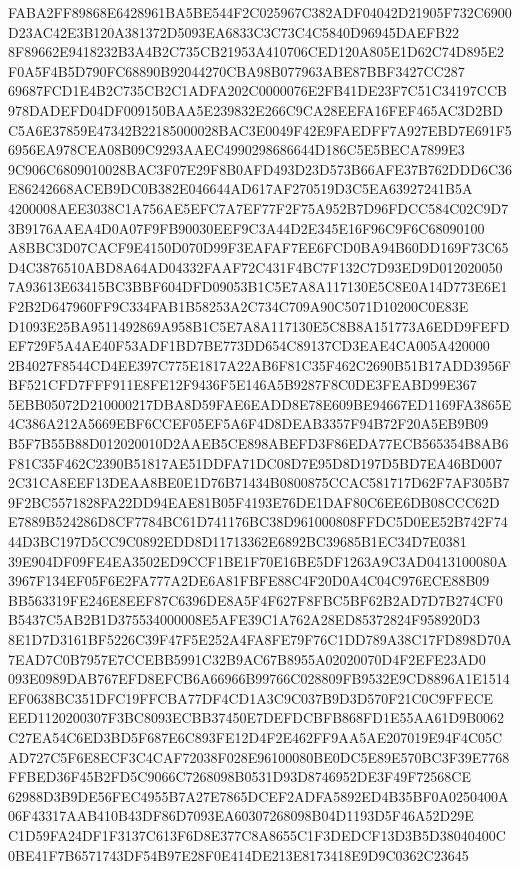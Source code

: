 \documentclass[UTF8,fontset=fandol,zihao=-4,a4paper]{ctexart}
\begin{document}
{{FABA2FF89868E6428961BA5BE544F2C025967C382ADF04042D21905F732C6900D23AC42E3B120A381372D5093EA6833C3C73C4C5840D96945DAEFB22
8F89662E9418232B3A4B2C735CB21953A410706CED120A805E1D62C74D895E2F0A5F4B5D790FC68890B92044270CBA98B077963ABE87BBF3427CC287
69687FCD1E4B2C735CB2C1ADFA202C0000076E2FB41DE23F7C51C34197CCB978DADEFD04DF009150BAA5E239832E266C9CA28EEFA16FEF465AC3D2BD
C5A6E37859E47342B22185000028BAC3E0049F42E9FAEDFF7A927EBD7E691F56956EA978CEA08B09C9293AAEC4990298686644D186C5E5BECA7899E3
9C906C6809010028BAC3F07E29F8B0AFD493D23D573B66AFE37B762DDD6C36E86242668ACEB9DC0B382E046644AD617AF270519D3C5EA63927241B5A
4200008AEE3038C1A756AE5EFC7A7EF77F2F75A952B7D96FDCC584C02C9D73B9176AAEA4D0A07F9FB90030EEF9C3A44D2E345E16F96C9F6C68090100
A8BBC3D07CACF9E4150D070D99F3EAFAF7EE6FCD0BA94B60DD169F73C65D4C3876510ABD8A64AD04332FAAF72C431F4BC7F132C7D93ED9D012020050
7A93613E63415BC3BBF604DFD09053B1C5E7A8A117130E5C8E0A14D773E6E1F2B2D647960FF9C334FAB1B58253A2C734C709A90C5071D10200C0E83E
D1093E25BA9511492869A958B1C5E7A8A117130E5C8B8A151773A6EDD9FEFDEF729F5A4AE40F53ADF1BD7BE773DD654C89137CD3EAE4CA005A420000
2B4027F8544CD4EE397C775E1817A22AB6F81C35F462C2690B51B17ADD3956FBF521CFD7FFF911E8FE12F9436F5E146A5B9287F8C0DE3FEABD99E367
5EBB05072D210000217DBA8D59FAE6EADD8E78E609BE94667ED1169FA3865E4C386A212A5669EBF6CCEF05EF5A6F4D8DEAB3357F94B72F20A5EB9B09
B5F7B55B88D012020010D2AAEB5CE898ABEFD3F86EDA77ECB565354B8AB6F81C35F462C2390B51817AE51DDFA71DC08D7E95D8D197D5BD7EA46BD007
2C31CA8EEF13DEAA8BE0E1D76B71434B0800875CCAC581717D62F7AF305B79F2BC5571828FA22DD94EAE81B05F4193E76DE1DAF80C6EE6DB08CCC62D
E7889B524286D8CF7784BC61D741176BC38D961000808FFDC5D0EE52B742F7444D3BC197D5CC9C0892EDD8D11713362E6892BC39685B1EC34D7E0381
39E904DF09FE4EA3502ED9CCF1BE1F70E16BE5DF1263A9C3AD0413100080A3967F134EF05F6E2FA777A2DE6A81FBFE88C4F20D0A4C04C976ECE88B09
BB563319FE246E8EEF87C6396DE8A5F4F627F8FBC5BF62B2AD7D7B274CF0B5437C5AB2B1D375534000008E5AFE39C1A762A28ED85372824F958920D3
8E1D7D3161BF5226C39F47F5E252A4FA8FE79F76C1DD789A38C17FD898D70A7EAD7C0B7957E7CCEBB5991C32B9AC67B8955A02020070D4F2EFE23AD0
093E0989DAB767EFD8EFCB6A66966B99766C028809FB9532E9CD8896A1E1514EF0638BC351DFC19FFCBA77DF4CD1A3C9C037B9D3D570F21C0C9FFECE
EED1120200307F3BC8093ECBB37450E7DEFDCBFB868FD1E55AA61D9B0062C27EA54C6ED3BD5F687E6C893FE12D4F2E462FF9AA5AE207019E94F4C05C
AD727C5F6E8ECF3C4CAF72038F028E96100080BE0DC5E89E570BC3F39E7768FFBED36F45B2FD5C9066C7268098B0531D93D8746952DE3F49F72568CE
62988D3B9DE56FEC4955B7A27E7865DCEF2ADFA5892ED4B35BF0A0250400A06F43317AAB410B43DF86D7093EA60307268098B04D1193D5F46A52D29E
C1D59FA24DF1F3137C613F6D8E377C8A8655C1F3DEDCF13D3B5D38040400C0BE41F7B6571743DF54B97E28F0E414DE213E8173418E9D9C0362C23645
}}
\end{document}
